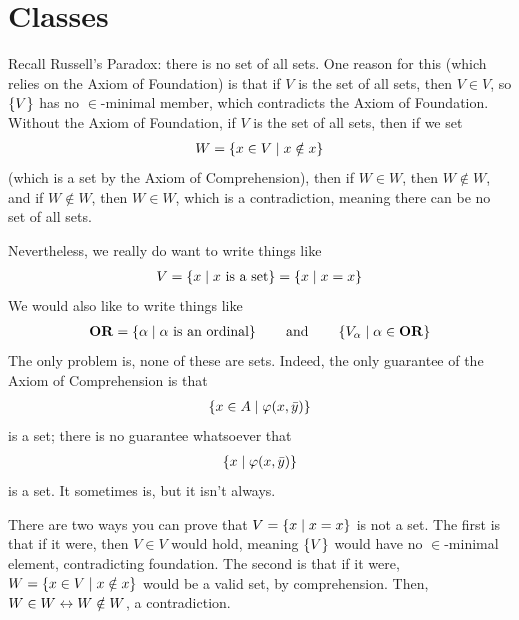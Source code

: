 \section{Classes}

Recall Russell's Paradox: there is no set of all sets. One reason for this (which relies on the Axiom of Foundation) is that if $V$ is the set of all sets, then $V \in V$, so $\left\{ V \right\}$ has no $\in$-minimal member, which contradicts the Axiom of Foundation. Without the Axiom of Foundation, if $V$ is the set of all sets, then if we set
\begin{align*}
    W = \left\{ x \in V \; \middle\vert \; x \notin x \right\}
\end{align*}
(which is a set by the Axiom of Comprehension), then if $W \in W$, then $W \notin W$, and if $W \notin W$, then $W \in W$, which is a contradiction, meaning there can be no set of all sets.

Nevertheless, we really do want to write things like
\begin{align*}
    V = \left\{ x \; \middle\vert \; x \text{ is a set} \right\} = \left\{ x \; \middle\vert \; x = x \right\}
\end{align*}
We would also like to write things like
\begin{align*}
    \mathbf{OR} = \left\{ \alpha \; \middle\vert \; \alpha \text{ is an ordinal} \right\} \qquad \text{and} \qquad \left\{ V_{\alpha} \; \middle\vert \; \alpha \in \mathbf{OR} \right\}
\end{align*}
The only problem is, none of these are sets. Indeed, the only guarantee of the Axiom of Comprehension is that
\begin{align*}
    \left\{ x \in A \; \middle\vert \; \varphi\!\left( x, \bar{y} \right) \right\}
\end{align*}
is a set; there is no guarantee whatsoever that
\begin{align*}
    \left\{ x \; \middle\vert \; \varphi\!\left( x, \bar{y} \right) \right\}
\end{align*}
is a set. It sometimes is, but it isn't always.

There are two ways you can prove that $V = \left\{ x \; \middle\vert \; x = x \right\}$ is not a set. The first is that if it were, then $V \in V$ would hold, meaning $\left\{ V \right\}$ would have no $\in$-minimal element, contradicting foundation. The second is that if it were, $W = \left\{ x \in V \; \middle\vert \; x \notin x \right\}$ would be a valid set, by comprehension. Then, $W \in W \leftrightarrow W \notin W$, a contradiction.

